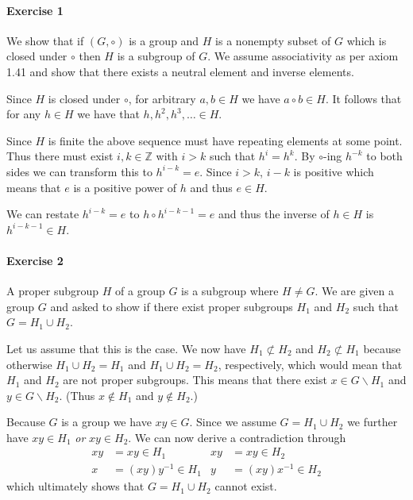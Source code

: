 \documentclass{article}
\begin{document}
\paragraph{Exercise 1}

We show that if $(G, \circ)$ is a group and $H$ is a nonempty subset of $G$ which is closed under $\circ$ then $H$ is a subgroup of $G$. We assume associativity as per axiom 1.41 and show that there exists a neutral element and inverse elements.

Since $H$ is closed under $\circ$, for arbitrary $a, b \in H$ we have $a \circ b \in H$. It follows that for any $h \in H$ we have that $h, h^2, h^3, \ldots \in H$.

Since $H$ is finite the above sequence must have repeating elements at some point. Thus there must exist $i, k \in \mathbb{Z}$ with $i > k$ such that $h^i = h^k$. By $\circ$-ing $h^{-k}$ to both sides we can transform this to $h^{i - k} = e$. Since $i > k$, $i - k$ is positive which means that $e$ is a positive power of $h$ and thus $e \in H$.

We can restate $h^{i - k} = e$ to $h \circ h^{i - k - 1} = e$ and thus the inverse of $h \in H$ is $h^{i - k - 1} \in H$.

\paragraph{Exercise 2}

A proper subgroup $H$ of a group $G$ is a subgroup where $H \neq G$. We are given a group $G$ and asked to show if there exist proper subgroups $H_1$ and $H_2$ such that $G = H_1 \cup H_2$.

Let us assume that this is the case. We now have $H_1 \not\subset H_2$ and $H_2 \not\subset H_1$ because otherwise $H_1 \cup H_2 = H_1$ and $H_1 \cup H_2 = H_2$, respectively, which would mean that $H_1$ and $H_2$ are not proper subgroups. This means that there exist $x \in G \backslash H_1$ and $y \in G \backslash H_2$. (Thus $x \not\in H_1$ and $y \not\in H_2$.)

Because $G$ is a group we have $xy \in G$. Since we assume $G = H_1 \cup H_2$ we further have $xy \in H_1$ \emph{or} $xy \in H_2$. We can now derive a contradiction through
\begin{align*}
    xy &= xy \in H_1 & xy &= xy \in H_2 \\
    x &= (xy)y^{-1} \in H_1 & y &= (xy)x^{-1} \in H_2
\end{align*}
which ultimately shows that $G = H_1 \cup H_2$ cannot exist.
\end{document}
